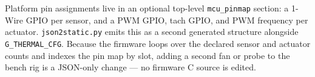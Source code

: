Platform pin assignments live in an optional top-level \texttt{mcu\_pinmap} section: a 1-Wire GPIO per sensor, and a PWM GPIO, tach GPIO, and PWM frequency per actuator. \texttt{json2static.py} emits this as a second generated structure alongside \texttt{G\_THERMAL\_CFG}. Because the firmware loops over the declared sensor and actuator counts and indexes the pin map by slot, adding a second fan or probe to the bench rig is a JSON-only change --- no firmware C source is edited.

\endinput
